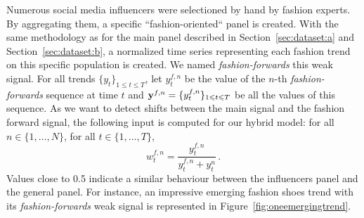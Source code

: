\documentclass[lettersize,journal]{IEEEtran}
\newcommand{\ts}{y}
\newcommand{\fullts}{{\bf \ts}}
\newcommand{\ws}{w}
\begin{document}
Numerous social media influencers were selectioned by hand by fashion experts. By aggregating them, a specific ``fashion-oriented`` panel is created. With the same methodology as for the main panel described in Section~\ref{sec:dataset:a} and Section~\ref{sec:dataset:b}, a normalized time series representing each fashion trend on this specific population is created. We named \textit{fashion-forwards} this weak signal.  For all trends $\{y_t\}_{1\leqslant t\leqslant T}$, let $\ts_t^{f,n}$ be the value of the $n$-th \textit{fashion-forwards} sequence at time $t$ and  $\fullts^{f,n} = \{\ts_t^{f,n}\}_{1\leqslant t \leqslant T}$ be all the values of this sequence.
As we want to detect shifts between the main signal and the fashion forward signal, the following input is computed for our hybrid model:  for all $n \in \{1,\ldots,N\}$, for all $t \in \{1,\ldots,T\}$,
$$
\ws^{f,n}_{t} = \frac{\ts_t^{f,n}}{\ts_t^{f,n}+\ts_t^{n}}\,.
$$
Values close to 0.5 indicate a similar behaviour between the influencers panel and the general panel. For instance, an impressive emerging fashion shoes trend with its \textit{fashion-forwards} weak signal is represented in Figure~\ref{fig:oneemergingtrend}. 


%
\end{document}
